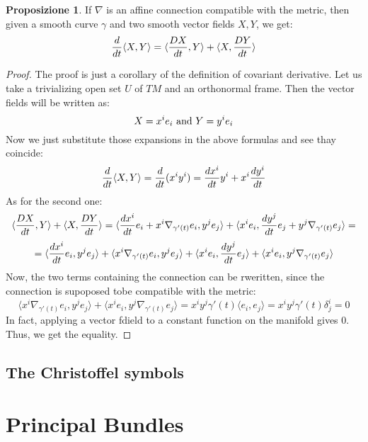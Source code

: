 \documentclass[12pt,a4paper]{report}
\theoremstyle{definition}
\theoremstyle{Theorem}
\newtheorem{Prop}[Def]{Proposizione}
\theoremstyle{definition}
\theoremstyle{definition}
\theoremstyle{definition}
\begin{document}
	\begin{Prop}
		If $\nabla$ is an affine connection compatible with the metric, then given a smooth curve $\gamma$ and two smooth vector fields $X,Y$, we get:
		$${d\over dt}\langle X,Y\rangle=\langle {DX\over dt},Y\rangle+\langle X,{DY\over dt}\rangle$$
	\end{Prop}
	\begin{proof}
		The proof is just a corollary of the definition of covariant derivative. Let us take a trivializing open set $U$ of $TM$ and an orthonormal frame. Then the vector fields will be written as:
		$$X=x^ie_i \hbox{ and } Y=y^ie_i$$
		Now we just substitute those expansions in the above formulas and see thay coincide:
		$${d\over dt}\langle X,Y\rangle={d\over dt}(x^iy^i)={dx^i\over dt}y^i+x^i{dy^i\over dt}$$
		As for the second one:
		$$\langle {DX\over dt},Y\rangle+\langle X,{DY\over dt}\rangle=
		\langle {dx^i\over dt}e_i+x^i\nabla_{\gamma'(t)}e_i,y^je_j\rangle+\langle x^ie_i,{dy^j\over dt}e_j+y^j\nabla_{\gamma'(t)}e_j\rangle=$$
		$$=\langle {dx^i\over dt}e_i,y^je_j\rangle+\langle x^i\nabla_{\gamma'(t)}e_i,y^je_j\rangle+\langle x^ie_i,{dy^j\over dt}e_j\rangle+\langle x^ie_i,y^j\nabla_{\gamma'(t)}e_j\rangle$$
		Now, the two terms containing the connection can be rweritten, since the connection is supoposed tobe compatible with the metric:
		$$\langle x^i\nabla_{\gamma'(t)}e_i,y^je_j\rangle+\langle x^ie_i,y^j\nabla_{\gamma'(t)}e_j\rangle=x^iy^j\gamma'(t)\langle e_i,e_j\rangle=x^iy^j\gamma'(t)\delta^i_j=0$$
		In fact, applying a vector fdield to a constant function on the manifold gives 0.
		Thus, we get the equality.
	\end{proof}
	\section{The Christoffel symbols}
	\chapter{Principal Bundles}
	
\end{document}
